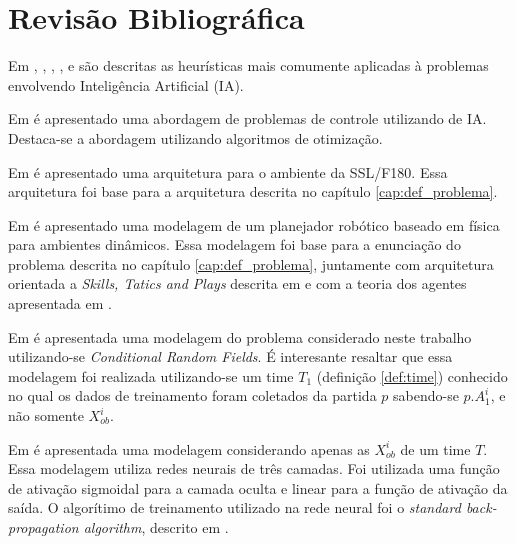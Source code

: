\chapter{Revisão Bibliográfica}\label{cap:rev_bibliografica}


Em \cite{russellnorvig}, \cite{haykin2001redes}, \cite{kosko1997fuzzy}, \cite{passos2005datamining},
\cite{doringo2004ant} e \cite{bertsimas1993simulated} são descritas as heurísticas
mais comumente aplicadas à problemas envolvendo Inteligência Artificial (IA).

Em \cite{yoneyama2004ia} é apresentado uma abordagem de problemas de controle utilizando de IA. Destaca-se
a abordagem utilizando algoritmos de otimização.

Em \cite{felixnavarro} é apresentado uma arquitetura para o ambiente da SSL/F180. Essa arquitetura foi base
para a arquitetura descrita no capítulo \ref{cap:def_problema}.

Em \cite{zickler} é apresentado uma modelagem de um planejador robótico baseado em física para ambientes dinâmicos. 
Essa modelagem foi base para a enunciação do problema descrita no capítulo \ref{cap:def_problema}, juntamente com 
arquitetura orientada a \textit{Skills, Tatics and Plays} descrita em \cite{bowling2003plays} e com a teoria dos 
agentes apresentada em \cite{russellnorvig}.

Em \cite{vail2008crf} é apresentada uma modelagem do problema considerado neste trabalho
utilizando-se \textit{Conditional Random Fields}. É interesante resaltar que essa modelagem
foi realizada utilizando-se um time $T_1$ (definição \ref{def:time}) conhecido no qual os dados
de treinamento foram coletados da partida $p$ sabendo-se $p.A_1^{i}$, e não somente $X_{ob}^{i}$.

Em \cite{sheng2005motionprediction} é apresentada uma modelagem considerando apenas as $X_{ob}^{i}$
de um time $T$. Essa modelagem utiliza redes neurais de três camadas. Foi utilizada
uma função de ativação sigmoidal para a camada oculta e linear para a função de 
ativação da saída. O algorítimo de treinamento utilizado na rede neural foi o \textit{standard back-propagation
algorithm}, descrito em \cite{haykin2001redes}.

